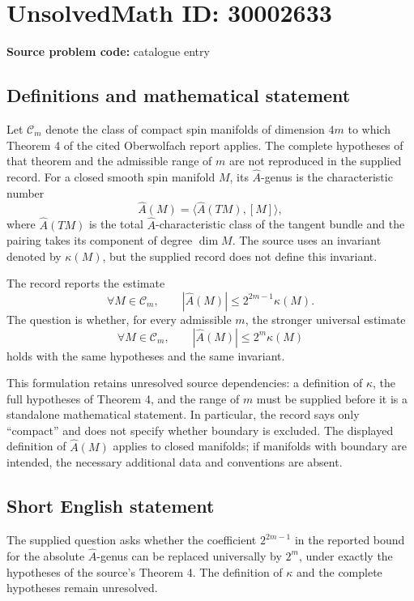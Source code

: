 \documentclass[11pt]{article}
\begin{document}
\section*{UnsolvedMath ID: 30002633}
\textbf{Source problem code:} catalogue entry
\subsection{Definitions and mathematical statement}
Let \(\mathcal C_m\) denote the class of compact spin manifolds of dimension \(4m\) to which Theorem 4 of the cited Oberwolfach report applies. The complete hypotheses of that theorem and the admissible range of \(m\) are not reproduced in the supplied record. For a closed smooth spin manifold \(M\), its \(\hat A\)-genus is the characteristic number
\[
\hat A(M)=\bigl\langle \hat A(TM),[M]\bigr\rangle,
\]
where \(\hat A(TM)\) is the total \(\hat A\)-characteristic class of the tangent bundle and the pairing takes its component of degree \(\dim M\). The source uses an invariant denoted by \(\kappa(M)\), but the supplied record does not define this invariant.

The record reports the estimate
\[
\forall M\in\mathcal C_m,\qquad |\hat A(M)|\leq 2^{2m-1}\kappa(M).
\]
The question is whether, for every admissible \(m\), the stronger universal estimate
\[
\forall M\in\mathcal C_m,\qquad |\hat A(M)|\leq 2^m\kappa(M)
\]
holds with the same hypotheses and the same invariant.

This formulation retains unresolved source dependencies: a definition of \(\kappa\), the full hypotheses of Theorem 4, and the range of \(m\) must be supplied before it is a standalone mathematical statement. In particular, the record says only ``compact'' and does not specify whether boundary is excluded. The displayed definition of \(\hat A(M)\) applies to closed manifolds; if manifolds with boundary are intended, the necessary additional data and conventions are absent.
\subsection{Short English statement}
The supplied question asks whether the coefficient \(2^{2m-1}\) in the reported bound for the absolute \(\hat A\)-genus can be replaced universally by \(2^m\), under exactly the hypotheses of the source's Theorem 4. The definition of \(\kappa\) and the complete hypotheses remain unresolved.
\end{document}
